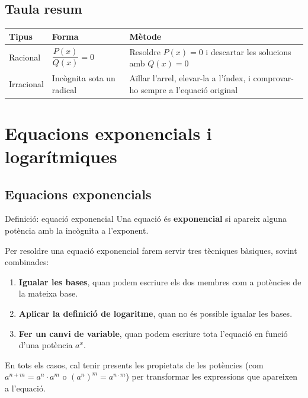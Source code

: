 \subsection{Taula resum}

\begin{center}
\begin{tabularx}{\linewidth}{lYY}
\toprule
\textbf{Tipus} & \textbf{Forma} & \textbf{Mètode} \\
\midrule
Racional & $\dfrac{P(x)}{Q(x)}=0$ & Resoldre $P(x)=0$ i descartar les solucions amb $Q(x)=0$ \\
Irracional & Incògnita sota un radical & Aïllar l'arrel, elevar-la a l'índex, i comprovar-ho sempre a l'equació original \\
\bottomrule
\end{tabularx}
\end{center}

\section{Equacions exponencials i logarítmiques}

\subsection{Equacions exponencials}

\begin{definicio}{Definició: equació exponencial}
Una equació és \textbf{exponencial} si apareix alguna potència amb la incògnita a l'exponent.
\end{definicio}

Per resoldre una equació exponencial farem servir tres tècniques bàsiques, sovint combinades:

\begin{enumerate}
\item \textbf{Igualar les bases}, quan podem escriure els dos membres com a potències de la mateixa base.
\item \textbf{Aplicar la definició de logaritme}, quan no és possible igualar les bases.
\item \textbf{Fer un canvi de variable}, quan podem escriure tota l'equació en funció d'una potència $a^x$.
\end{enumerate}

En tots els casos, cal tenir presents les propietats de les potències (com $a^{n+m} = a^n \cdot a^m$ o $(a^n)^m = a^{n\cdot m}$) per transformar les expressions que apareixen a l'equació.

